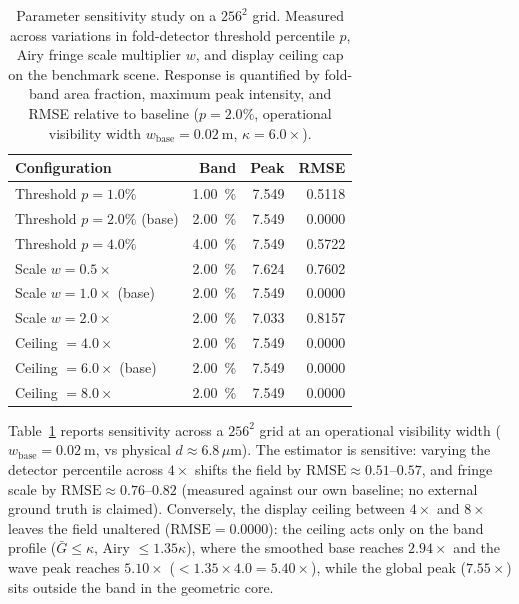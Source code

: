 \begin{table}[tbp]
\centering
\caption{Parameter sensitivity study on a $256^2$ grid. Measured across variations in fold-detector
threshold percentile $p$, Airy fringe scale multiplier $w$, and display ceiling cap on the
benchmark scene. Response is quantified by fold-band area fraction, maximum peak
intensity, and RMSE relative to baseline ($p=2.0\%$, operational visibility width $w_{\text{base}}=\SI{0.02}{\meter}$,
$\kappa=6.0\times$).}
\label{tab:sensitivity}
\small
\begin{tabular*}{\columnwidth}{@{\extracolsep{\fill}}lrrr@{}}
\toprule
Configuration & Band & Peak & RMSE \\
\midrule
Threshold $p = 1.0\%$ & \SI{1.00}{\percent} & 7.549 & 0.5118 \\
Threshold $p = 2.0\%$ (base) & \SI{2.00}{\percent} & 7.549 & 0.0000 \\
Threshold $p = 4.0\%$ & \SI{4.00}{\percent} & 7.549 & 0.5722 \\
\midrule
Scale $w = 0.5\times$ & \SI{2.00}{\percent} & 7.624 & 0.7602 \\
Scale $w = 1.0\times$ (base) & \SI{2.00}{\percent} & 7.549 & 0.0000 \\
Scale $w = 2.0\times$ & \SI{2.00}{\percent} & 7.033 & 0.8157 \\
\midrule
Ceiling $= 4.0\times$ & \SI{2.00}{\percent} & 7.549 & 0.0000 \\
Ceiling $= 6.0\times$ (base) & \SI{2.00}{\percent} & 7.549 & 0.0000 \\
Ceiling $= 8.0\times$ & \SI{2.00}{\percent} & 7.549 & 0.0000 \\
\bottomrule
\end{tabular*}
\end{table}

Table~\ref{tab:sensitivity} reports sensitivity across a $256^2$ grid at an operational visibility width ($w_{\text{base}} = \SI{0.02}{\meter}$, vs physical $d \approx 6.8\,\mu\text{m}$). The estimator is sensitive: varying the detector percentile across $4\times$ shifts the field by $\text{RMSE} \approx 0.51$--$0.57$, and fringe scale by $\text{RMSE} \approx 0.76$--$0.82$ (measured against our own baseline; no external ground truth is claimed). Conversely, the display ceiling between $4\times$ and $8\times$ leaves the field unaltered ($\text{RMSE} = 0.0000$): the ceiling acts only on the band profile ($\bar G \le \kappa$, Airy $\le 1.35\kappa$), where the smoothed base reaches $2.94\times$ and the wave peak reaches $5.10\times$ ($< 1.35 \times 4.0 = 5.40\times$), while the global peak ($7.55\times$) sits outside the band in the geometric core.

